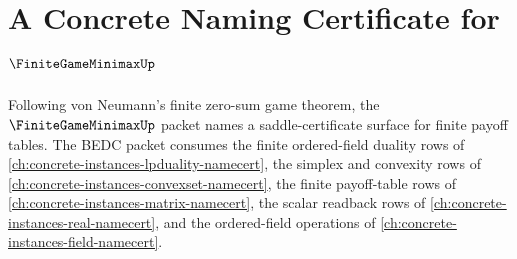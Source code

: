 \chapter{A Concrete Naming Certificate for $\FiniteGameMinimaxUp$}
\label{ch:concrete-instances-finite-game-minimax-namecert}

Following von Neumann's finite zero-sum game theorem, the $\FiniteGameMinimaxUp$ packet names a saddle-certificate surface for finite payoff tables. The BEDC packet consumes the finite ordered-field duality rows of \autoref{ch:concrete-instances-lpduality-namecert}, the simplex and convexity rows of \autoref{ch:concrete-instances-convexset-namecert}, the finite payoff-table rows of \autoref{ch:concrete-instances-matrix-namecert}, the scalar readback rows of \autoref{ch:concrete-instances-real-namecert}, and the ordered-field operations of \autoref{ch:concrete-instances-field-namecert}.

